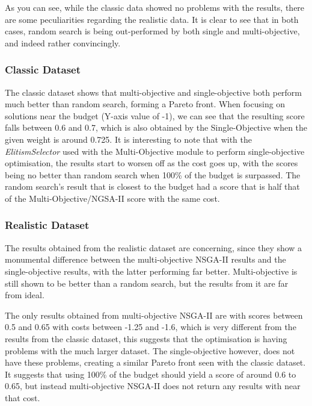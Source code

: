 \documentclass[11pt, a4paper]{article}
\begin{document}
As you can see, while the classic data showed no problems with the results,
there are some peculiarities regarding the realistic data. It is clear to see
that in both cases, random search is being out-performed by both single and
multi-objective, and indeed rather convincingly. 

\subsubsection{Classic Dataset} %
\label{ssub:classic_dataset}
The classic dataset shows that multi-objective and single-objective both perform
much better than random search, forming a Pareto front. When focusing on
solutions near the budget (Y-axis value of -1), we can see that the resulting
score falls between 0.6 and 0.7, which is also obtained by the Single-Objective
when the given weight is around 0.725. It is interesting to note that with
the \emph{ElitismSelector} used with the Multi-Objective module to perform
single-objective optimisation, the results start to worsen off as the cost goes
up, with the scores being no better than random search when 100\% of the budget
is surpassed. The random search's result that is closest to the budget had a
score that is half that of the Multi-Objective/NGSA-II score with the same cost.

\subsubsection{Realistic Dataset} %
\label{ssub:realistic_dataset}
The results obtained from the realistic dataset are concerning, since they show
a monumental difference between the multi-objective NSGA-II results and the
single-objective results, with the latter performing far better. Multi-objective
is still shown to be better than a random search, but the results from it are
far from ideal.

The only results obtained from multi-objective NSGA-II are with scores between
0.5 and 0.65 with costs between -1.25 and -1.6, which is very different from the
results from the classic dataset, this suggests that the optimisation is having
problems with the much larger dataset. The single-objective however, does not
have these problems, creating a similar Pareto front seen with the classic
dataset. It suggests that using 100\% of the budget should yield a score of
around 0.6 to 0.65, but instead multi-objective NSGA-II does not return any
results with near that cost.
\end{document}
